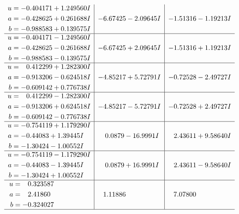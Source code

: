 \documentclass[1p]{elsarticle_modified}
\theoremstyle{definition}
\begin{document}
$$\begin{array}{c|c|c}
\begin{aligned}
u &= -0.404171 + 1.249560 I \\
a &= -0.428625 + 0.261688 I \\
b &= -0.988583 + 0.139575 I\end{aligned}
 & -6.67425 - 2.09645 I & -1.51316 - 1.19213 I \\ \hline\begin{aligned}
u &= -0.404171 - 1.249560 I \\
a &= -0.428625 - 0.261688 I \\
b &= -0.988583 - 0.139575 I\end{aligned}
 & -6.67425 + 2.09645 I & -1.51316 + 1.19213 I \\ \hline\begin{aligned}
u &= \phantom{-}0.412299 + 1.282300 I \\
a &= -0.913206 - 0.624518 I \\
b &= -0.609142 + 0.776738 I\end{aligned}
 & -4.85217 + 5.72791 I & -0.72528 - 2.49727 I \\ \hline\begin{aligned}
u &= \phantom{-}0.412299 - 1.282300 I \\
a &= -0.913206 + 0.624518 I \\
b &= -0.609142 - 0.776738 I\end{aligned}
 & -4.85217 - 5.72791 I & -0.72528 + 2.49727 I \\ \hline\begin{aligned}
u &= -0.754119 + 1.179290 I \\
a &= -0.44083 + 1.39445 I \\
b &= -1.30424 - 1.00552 I\end{aligned}
 & \phantom{-}0.0879 - 16.9991 I & \phantom{-}2.43611 + 9.58640 I \\ \hline\begin{aligned}
u &= -0.754119 - 1.179290 I \\
a &= -0.44083 - 1.39445 I \\
b &= -1.30424 + 1.00552 I\end{aligned}
 & \phantom{-}0.0879 + 16.9991 I & \phantom{-}2.43611 - 9.58640 I \\ \hline\begin{aligned}
u &= \phantom{-}0.323587\phantom{ +0.000000I} \\
a &= \phantom{-}2.41860\phantom{ +0.000000I} \\
b &= -0.324027\phantom{ +0.000000I}\end{aligned}
 & \phantom{-}1.11886\phantom{ +0.000000I} & \phantom{-}7.07800\phantom{ +0.000000I}\\
 \hline 
 \end{array}$$\newpage\newpage\renewcommand{\arraystretch}{1}
\end{document}
